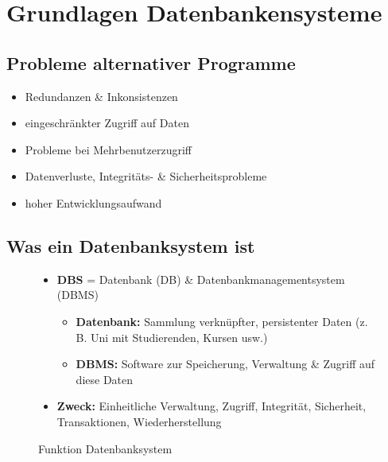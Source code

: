 \documentclass[12pt,a4paper]{article}
\begin{document}
\tableofcontents
\newpage

\section{Grundlagen Datenbankensysteme}

\subsection{Probleme alternativer Programme}

\begin{itemize}
\item Redundanzen \& Inkonsistenzen
\item eingeschränkter Zugriff auf Daten
\item Probleme bei Mehrbenutzerzugriff
\item Datenverluste, Integritäts- \& Sicherheitsprobleme
\item hoher Entwicklungsaufwand
\end{itemize}

\subsection{Was ein Datenbanksystem ist}

\begin{figure}[H]
\begin{minipage}[t]{0.45\textwidth}
\begin{itemize}
\item \textbf{DBS} = Datenbank (DB) \& Datenbankmanagementsystem (DBMS)
\begin{itemize}
\item \textbf{Datenbank:} Sammlung verknüpfter, persistenter Daten (z. B. Uni mit Studierenden, Kursen usw.)
\item \textbf{DBMS:} Software zur Speicherung, Verwaltung \& Zugriff auf diese Daten
\end{itemize}
\item \textbf{Zweck:} Einheitliche Verwaltung, Zugriff, Integrität, Sicherheit, Transaktionen, Wiederherstellung
\end{itemize}
\end{minipage}
\hfill
\begin{minipage}[t]{0.45\textwidth}
\centering
\vspace{5mm}
\caption{Funktion Datenbanksystem}
\end{minipage}
\end{figure}
\end{document}
